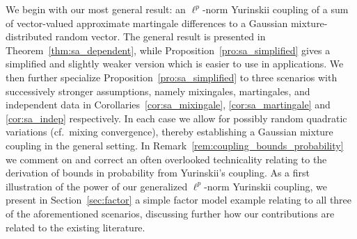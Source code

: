 We begin with our most general result: an $\ell^p$-norm Yurinskii coupling of a
sum of vector-valued approximate martingale differences to a Gaussian
mixture-distributed random vector. The general result is presented in
Theorem~\ref{thm:sa_dependent}, while Proposition~\ref{pro:sa_simplified} gives
a simplified and slightly weaker version which is easier to use in
applications. We then further specialize Proposition~\ref{pro:sa_simplified} to
three scenarios with successively stronger assumptions, namely mixingales,
martingales, and independent data in Corollaries~\ref{cor:sa_mixingale},
\ref{cor:sa_martingale} and \ref{cor:sa_indep} respectively. In each case we
allow for possibly random quadratic variations (cf.\ mixing convergence),
thereby establishing a Gaussian mixture coupling in the general setting. In
Remark~\ref{rem:coupling_bounds_probability} we comment on and correct an often
overlooked technicality relating to the derivation of bounds in probability
from Yurinskii's coupling. As a first illustration of the power of our
generalized $\ell^p$-norm Yurinskii coupling, we present in
Section~\ref{sec:factor} a simple factor model example relating to all three of
the aforementioned scenarios, discussing further how our contributions are
related to the existing literature.

